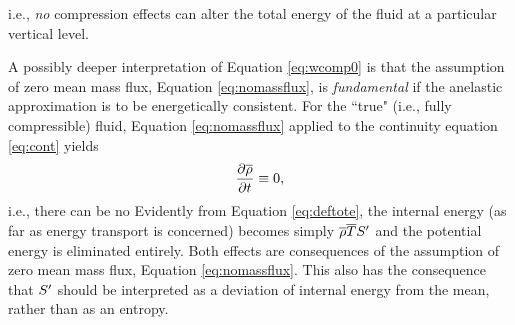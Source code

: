 \documentclass[12pt]{article}
\begin{document}
i.e., \textit{no} compression effects can alter the total energy of the fluid at a particular vertical level.

A possibly deeper interpretation of Equation \eqref{eq:wcomp0} is that the assumption of zero mean mass flux, Equation \eqref{eq:nomassflux}, is \textit{fundamental} if the anelastic approximation is to be energetically consistent. For the ``true" (i.e., fully compressible) fluid, Equation \eqref{eq:nomassflux} applied to the continuity equation \eqref{eq:cont} yields
\begin{align}
	\frac{\partial\overline{\rho}}{\partial t}\equiv0,
\end{align}
i.e., there can be no
Evidently from Equation \eqref{eq:deftote}, the internal energy (as far as energy transport is concerned) becomes simply $\overline{\rho}\overline{T} {S^\prime}$ and the potential energy is eliminated entirely. Both effects are consequences of the assumption of zero mean mass flux, Equation \eqref{eq:nomassflux}. This also has the consequence that ${S^\prime}$ should be interpreted as a deviation of internal energy from the mean, rather than as an entropy. 

\end{document}
